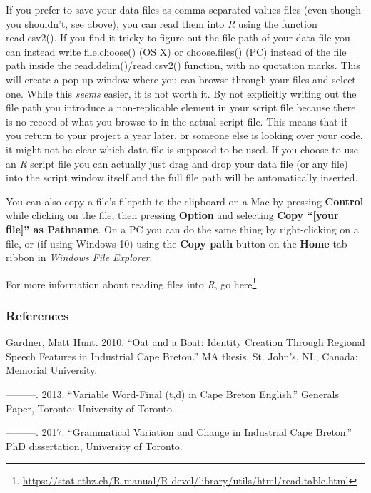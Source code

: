 \documentclass[
  10pt,
  letterpaper]{article}
\newlength{\cslhangindent}
\newlength{\cslentryspacingunit} %
\newenvironment{CSLReferences}[2] %
 {%
  \setlength{\parindent}{0pt}
  \ifodd #1
  \let\oldpar\par
  \def\par{\hangindent=\cslhangindent\oldpar}
  \fi
  \setlength{\parskip}{#2\cslentryspacingunit}
 }%
 {}
\renewcommand\texttt[1]{{\ttfamily\color{BrickRed}#1}}
\DeclareRobustCommand{\href}[2]{#2\footnote{\url{#1}}}
\begin{document}
If you prefer to save your data files as comma-separated-values files
(even though you shouldn't, see above), you can read them into \emph{R}
using the function \texttt{read.csv2()}. If you find it tricky to figure
out the file path of your data file you can instead write
\texttt{file.choose()} (OS X) or \texttt{choose.files()} (PC) instead of
the file path inside the \texttt{read.delim()}/\texttt{read.csv2()}
function, with no quotation marks. This will create a pop-up window
where you can browse through your files and select one. While this
\emph{seems} easier, it is not worth it. By not explicitly writing out
the file path you introduce a non-replicable element in your script file
because there is no record of what you browse to in the actual script
file. This means that if you return to your project a year later, or
someone else is looking over your code, it might not be clear which data
file is supposed to be used. If you choose to use an \emph{R} script
file you can actually just drag and drop your data file (or any file)
into the script window itself and the full file path will be
automatically inserted.

You can also copy a file's filepath to the clipboard on a Mac by
pressing \textbf{Control} while clicking on the file, then pressing
\textbf{Option} and selecting \textbf{Copy ``{[}your file{]}'' as
Pathname}. On a PC you can do the same thing by right-clicking on a
file, or (if using Windows 10) using the \textbf{Copy path} button on
the \textbf{Home} tab ribbon in \emph{Windows File Explorer}.

For more information about reading files into \emph{R}, go
\href{https://stat.ethz.ch/R-manual/R-devel/library/utils/html/read.table.html}{here}

\hypertarget{references}{%
\subsubsection{References}\label{references}}

\hypertarget{refs}{}
\begin{CSLReferences}{1}{0}
\leavevmode{}%
Gardner, Matt Hunt. 2010. {``{O}at and a {B}oat: {I}dentity Creation
Through Regional Speech Features in {I}ndustrial {C}ape {B}reton.''} MA
thesis, {S}t. {J}ohn's, {N}{L}, {C}anada: Memorial University.

\leavevmode{}%
---------. 2013. {``Variable Word-Final (t,d) in {C}ape {B}reton
{E}nglish.''} Generals Paper, {T}oronto: {U}niversity of {T}oronto.

\leavevmode{}%
---------. 2017. {``Grammatical Variation and Change in {I}ndustrial
{C}ape {B}reton.''} PhD dissertation, {U}niversity of {T}oronto.

\end{CSLReferences}
\end{document}
